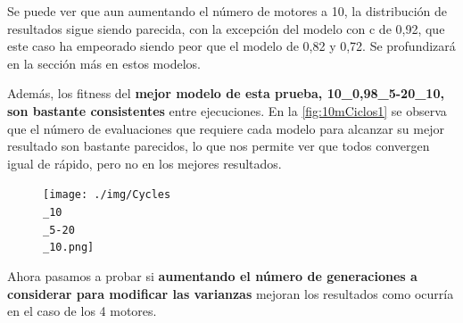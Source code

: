 \documentclass[12pt, spanish, pdftex]{UC3M_document}
\begin{document}
Se puede ver que aun aumentando el número de motores a 10, la distribución de resultados sigue siendo parecida, con la excepción del modelo con c de 0,92, que este caso ha empeorado siendo peor que el modelo de 0,82 y 0,72. Se profundizará en la sección  más en estos modelos.

Además, los fitness del \textbf{mejor modelo de esta prueba, 10\_0,98\_5-20\_10, son bastante consistentes} entre ejecuciones. En la \autoref{fig:10mCiclos1} se observa que el número de evaluaciones que requiere cada modelo para alcanzar su mejor resultado son bastante parecidos, lo que nos permite ver que todos convergen igual de rápido, pero no en los mejores resultados.

\begin{figure}[H]
	{\texttt{[image: ./img/Cycles\\\_10\\\_5-20\\\_10.png]}}
\end{figure}

Ahora pasamos a probar si \textbf{aumentando el número de generaciones a considerar para modificar las varianzas} mejoran los resultados como ocurría en el caso de los 4 motores.
\end{document}

